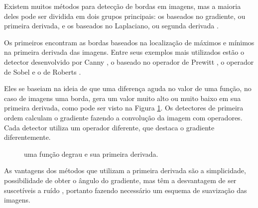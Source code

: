 Existem muitos métodos para detecção de bordas em imagens, mas a maioria deles pode ser dividida em dois grupos principais: os baseados no gradiente, ou primeira derivada, e os baseados no Laplaciano, ou segunda derivada \cite{tiposdetecborda}.

Os primeiros encontram as bordas baseados na localização de máximos e mínimos na primeira derivada das imagens. Entre seus exemplos mais utilizados estão o detector desenvolvido por Canny \cite{canny}, o baseado no operador de Prewitt \cite{prewitt}, o operador de Sobel \cite{citasobel} e o de Roberts \cite{roberts}.

Eles se baseiam na ideia de que uma diferença aguda no valor de uma função, no caso de imagens uma borda, gera um valor muito alto ou muito baixo em sua primeira derivada, como pode ser visto na Figura \ref{dif}. Os detectores de primeira ordem calculam o gradiente fazendo a convolução da imagem com operadores. Cada detector utiliza um operador diferente, que destaca o gradiente diferentemente.

\begin{figure}[h]
  \centering
  \hfill
  \caption{uma função degrau e sua primeira derivada.}
  \label{dif}
\end{figure}

As vantagens dos métodos que utilizam a primeira derivada são a simplicidade, possibilidade de obter o ângulo do gradiente, mas têm a desvantagem de ser suscetíveis a ruído \cite{comparaborda}, portanto fazendo necessário um esquema de suavização das imagens.


